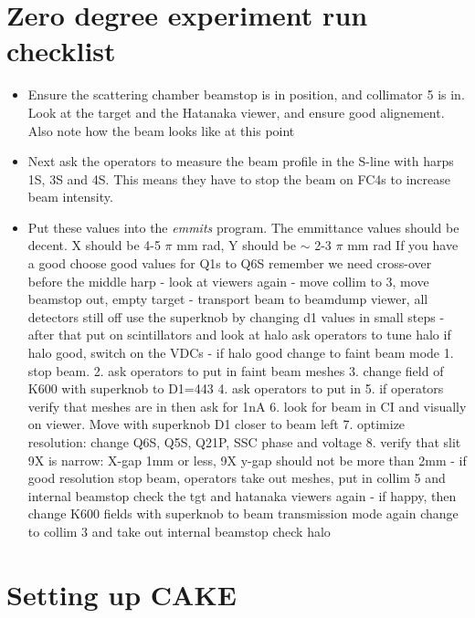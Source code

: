 \documentclass[11pt]{report}
\begin{document}
\chapter{Zero degree experiment run checklist}

\begin{itemize}  
\item Ensure the scattering chamber beamstop is in position, and collimator 5 is in.
Look at the target and the Hatanaka viewer, and ensure good alignement. Also note
how the beam looks like at this point
\item Next ask the operators to measure the beam profile in the S-line with harps
1S, 3S and 4S. This means they have to stop the beam on FC4s to increase beam intensity.
\item Put these values into the {\it emmits} program. 
The emmittance values should be decent.
X should be 4-5 $\pi$ mm rad, Y should be $\sim$ 2-3 $\pi$ mm rad
If you have a good 
   choose good values for Q1s to Q6S
 remember we need cross-over before the middle harp
- look at viewers again
- move collim to 3, move beamstop out, empty target
- transport beam to beamdump viewer, all detectors still off
  use the superknob by changing d1 values in small steps
- after that put on scintillators and look at halo
   ask operators to tune halo
   if halo good, switch on the VDCs 
- if halo good change to faint beam mode
    1. stop beam.
    2. ask operators to put in faint beam meshes
    3. change field of K600 with superknob to D1=443
    4. ask operators to put in  
    5. if operators verify that meshes are in then ask for 1nA
    6. look for beam in CI and visually on viewer. Move with superknob D1 closer to beam left
    7. optimize resolution: change Q6S, Q5S, Q21P, SSC phase and voltage
    8. verify that slit 9X is narrow: X-gap 1mm or less, 9X y-gap should not be more than 2mm
-  if good resolution 
    stop beam, operators take out meshes, put in collim 5 and internal beamstop
    check the tgt and hatanaka viewers again
-  if happy, then change K600 fields with superknob  to beam transmission mode again
    change to collim 3 and take out internal beamstop
   check halo
\end{itemize}

\chapter{Setting up CAKE}
\end{document}
